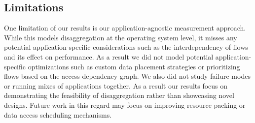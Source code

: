 \subsection{Limitations}
One limitation of our results is our application-agnostic measurement approach. While this models disaggregation at the operating system level, it misses any potential application-specific considerations such as the interdependency of flows and its effect on performance. As a result we did not model potential application-specific optimizations such as custom data placement strategies or prioritizing flows based on the access dependency graph. We also did not study failure modes or running mixes of applications together. As a result our results focus on demonstrating the feasibility of disaggregation rather than showcasing novel designs. Future work in this regard may focus on improving resource packing or data access scheduling mechanisms.









